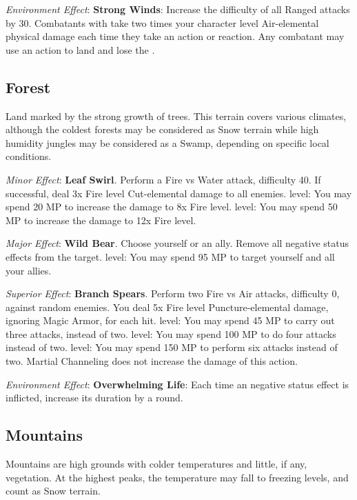 \begin{multicols}{2}
\textit{Environment Effect}: \textbf{Strong Winds}: Increase the difficulty of all Ranged attacks by 30. Combatants with  take two times your character level Air-elemental physical damage each time they take an action or reaction. Any combatant may use an action to land and lose the . 

\subsection*{Forest}\label{subsec:geo-forest}
Land marked by the strong growth of trees. This terrain covers various climates, although the coldest forests may be considered as Snow terrain while high humidity jungles may be considered as a Swamp, depending on specific local conditions.

\textit{Minor Effect}: \textbf{Leaf Swirl}. Perform a Fire vs Water attack, difficulty 40. If successful, deal 3x Fire level Cut-elemental damage to all enemies.  level: You may spend 20 MP to increase the damage to 8x Fire level.  level: You may spend 50 MP to increase the damage to 12x Fire level.

\textit{Major Effect}: \textbf{Wild Bear}. Choose yourself or an ally. Remove all negative status effects from the target.  level: You may spend 95 MP to target yourself and all your allies.

\textit{Superior Effect}: \textbf{Branch Spears}. Perform two Fire vs Air attacks, difficulty 0, against random enemies. You deal 5x Fire level Puncture-elemental damage, ignoring Magic Armor, for each hit.  level: You may spend 45 MP to carry out three attacks, instead of two.  level: You may spend 100 MP to do four attacks instead of two.  level: You may spend 150 MP to perform six attacks instead of two. Martial Channeling does not increase the damage of this action.

\textit{Environment Effect}: \textbf{Overwhelming Life}: Each time an negative status effect is inflicted, increase its duration by a round. 

\subsection*{Mountains}\label{subsec:geo-mountain}
Mountains are high grounds with colder temperatures and little, if any, vegetation. At the highest peaks, the temperature may fall to freezing levels, and count as Snow terrain.


\end{multicols}
